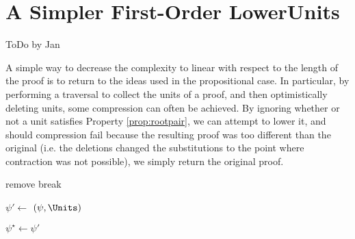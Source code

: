 
\section{A Simpler First-Order LowerUnits}
\label{sec:SimpleFOLU}

ToDo by Jan

%

A simple way to decrease the complexity to linear with respect to the length of the proof is to return to the ideas used in the propositional case. In particular, by performing a traversal to collect the units of a proof, and then optimistically deleting units, some compression can often be achieved. By ignoring whether or not a unit satisfies Property \ref{prop:rootpair}, we can attempt to lower it, and should compression fail because the resulting proof was too different than the original (i.e. the deletions changed the substitutions to the point where contraction was not possible), we simply return the original proof. 

\begin{algorithm}[bt]
  \SetAlgoVlined
  \SetAlgoShortEnd
{}
  \BlankLine


   {remove}
   {break}

  \BlankLine

  \BlankLine

\check{\Units} %

\BlankLine

    $\psi' \leftarrow $ $(\psi,\Units)$ \;
    \BlankLine

    

    $\psi^{\star} \leftarrow \psi'$ \;
  
    

  \caption{\SFOLowerUnits}
  \label{algo:simpleFOLU}
\end{algorithm}

